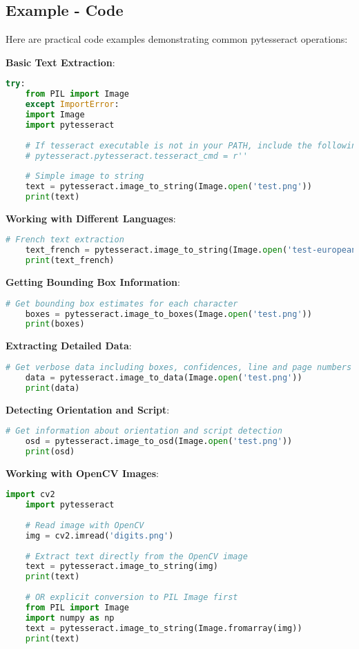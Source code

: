 \subsection{Example - Code}
Here are practical code examples demonstrating common pytesseract operations:

\textbf{Basic Text Extraction}:
\begin{lstlisting}[language=Python]
	try:
	from PIL import Image
	except ImportError:
	import Image
	import pytesseract
	
	# If tesseract executable is not in your PATH, include the following:
	# pytesseract.pytesseract.tesseract_cmd = r''
	
	# Simple image to string
	text = pytesseract.image_to_string(Image.open('test.png'))
	print(text)
\end{lstlisting}

\textbf{Working with Different Languages}:
\begin{lstlisting}[language=Python]
	# French text extraction
	text_french = pytesseract.image_to_string(Image.open('test-european.jpg'), lang='fra')
	print(text_french)
\end{lstlisting}

\textbf{Getting Bounding Box Information}:
\begin{lstlisting}[language=Python]
	# Get bounding box estimates for each character
	boxes = pytesseract.image_to_boxes(Image.open('test.png'))
	print(boxes)
\end{lstlisting}

\textbf{Extracting Detailed Data}:
\begin{lstlisting}[language=Python]
	# Get verbose data including boxes, confidences, line and page numbers
	data = pytesseract.image_to_data(Image.open('test.png'))
	print(data)
\end{lstlisting}

\textbf{Detecting Orientation and Script}:
\begin{lstlisting}[language=Python]
	# Get information about orientation and script detection
	osd = pytesseract.image_to_osd(Image.open('test.png'))
	print(osd)
\end{lstlisting}

\textbf{Working with OpenCV Images}:
\begin{lstlisting}[language=Python]
	import cv2
	import pytesseract
	
	# Read image with OpenCV
	img = cv2.imread('digits.png')
	
	# Extract text directly from the OpenCV image
	text = pytesseract.image_to_string(img)
	print(text)
	
	# OR explicit conversion to PIL Image first
	from PIL import Image
	import numpy as np
	text = pytesseract.image_to_string(Image.fromarray(img))
	print(text)
\end{lstlisting}

